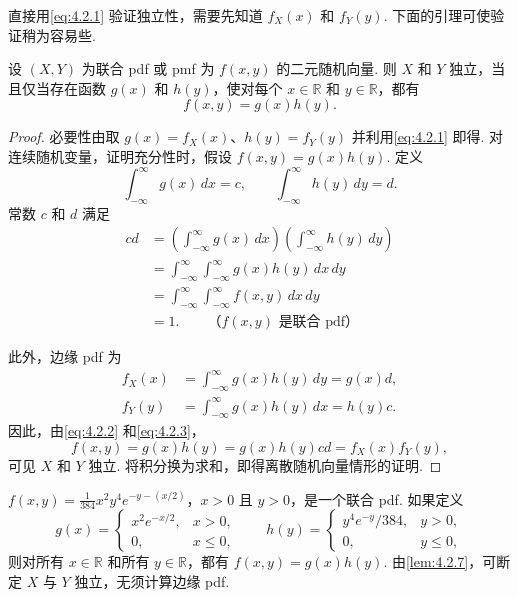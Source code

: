 直接用\eqref{eq:4.2.1} 验证独立性，需要先知道 $f_X(x)$ 和 $f_Y(y)$. 下面的引理可使验证稍为容易些.
\begin{lemma}\label{lem:4.2.7}
设 $(X,Y)$ 为联合 pdf 或 pmf 为 $f(x,y)$ 的二元随机向量. 则 $X$ 和 $Y$ 独立，当且仅当存在函数 $g(x)$ 和 $h(y)$，使对每个 $x\in\mathbb R$ 和 $y\in\mathbb R$，都有
$$f(x,y)=g(x)h(y).$$
\end{lemma}
\begin{proof}
必要性由取 $g(x)=f_X(x)$、$h(y)=f_Y(y)$ 并利用\eqref{eq:4.2.1} 即得. 对连续随机变量，证明充分性时，假设 $f(x,y)=g(x)h(y)$. 定义
$$\int_{-\infty}^{\infty}g(x)\,dx=c,\qquad\int_{-\infty}^{\infty}h(y)\,dy=d.$$
常数 $c$ 和 $d$ 满足
\begin{equation}\label{eq:4.2.2}
\begin{aligned}
cd&=\left(\int_{-\infty}^{\infty}g(x)\,dx\right)\left(\int_{-\infty}^{\infty}h(y)\,dy\right)\\
&=\int_{-\infty}^{\infty}\int_{-\infty}^{\infty}g(x)h(y)\,dx\,dy\\
&=\int_{-\infty}^{\infty}\int_{-\infty}^{\infty}f(x,y)\,dx\,dy\\
&=1.\qquad\text{（$f(x,y)$ 是联合 pdf）}
\end{aligned}
\end{equation}

此外，边缘 pdf 为
\begin{equation}\label{eq:4.2.3}
\begin{aligned}
f_X(x)&=\int_{-\infty}^{\infty}g(x)h(y)\,dy=g(x)d,\\
f_Y(y)&=\int_{-\infty}^{\infty}g(x)h(y)\,dx=h(y)c.
\end{aligned}
\end{equation}
因此，由\eqref{eq:4.2.2} 和\eqref{eq:4.2.3}，
$$f(x,y)=g(x)h(y)=g(x)h(y)cd=f_X(x)f_Y(y),$$
可见 $X$ 和 $Y$ 独立. 将积分换为求和，即得离散随机向量情形的证明.
\end{proof}
\begin{example}[独立性的检验——II]\label{ex:4.2.8}
$f(x,y)=\frac1{384}x^2y^4e^{-y-(x/2)}$，$x>0$ 且 $y>0$，是一个联合 pdf. 如果定义
$$g(x)=\begin{cases}x^2e^{-x/2},&x>0,\\0,&x\le0,\end{cases}\qquad
h(y)=\begin{cases}y^4e^{-y}/384,&y>0,\\0,&y\le0,\end{cases}$$
则对所有 $x\in\mathbb R$ 和所有 $y\in\mathbb R$，都有 $f(x,y)=g(x)h(y)$. 由\autoref{lem:4.2.7}，可断定 $X$ 与 $Y$ 独立，无须计算边缘 pdf.
\end{example}

